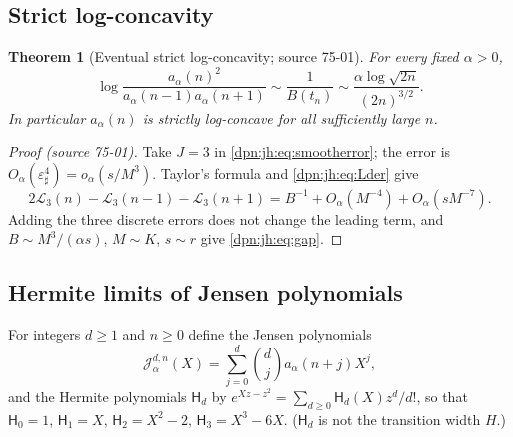 \documentclass[11pt]{article}
\numberwithin{equation}{section}
\newtheorem{theorem}{Theorem}[section]
\theoremstyle{definition}\newtheorem{definition}[theorem]{Definition}
\theoremstyle{remark}\newtheorem{remark}[theorem]{Remark}
\newcommand{\src}[1]{\textup{(source #1)}}
\newcommand{\epsh}{\varepsilon_{\sharp}}
\begin{document}
\subsection{Strict log-concavity}
\begin{theorem}[Eventual strict log-concavity; source 75-01]\label{dpn:jh:thm:concavity}
For every fixed $\alpha>0$,
\begin{equation}\label{dpn:jh:eq:gap}
 \log\frac{a_\alpha(n)^2}{a_\alpha(n-1)a_\alpha(n+1)}
 \sim\frac1{B(t_n)}\sim\frac{\alpha\log\sqrt{2n}}{(2n)^{3/2}}.
\end{equation}
In particular $a_\alpha(n)$ is strictly log-concave for all sufficiently large
$n$.
\end{theorem}
\begin{proof}[Proof \src{75-01}]
Take $J=3$ in \eqref{dpn:jh:eq:smootherror}; the error is
$O_\alpha(\epsh^4)=o_\alpha(s/M^3)$.  Taylor's formula and
\eqref{dpn:jh:eq:Lder} give
\[
 2\mathcal L_3(n)-\mathcal L_3(n-1)-\mathcal L_3(n+1)
 =B^{-1}+O_\alpha(M^{-4})+O_\alpha(sM^{-7}).
\]
Adding the three discrete errors does not change the leading term, and
$B\sim M^3/(\alpha s)$, $M\sim K$, $s\sim r$ give \eqref{dpn:jh:eq:gap}.
\end{proof}

\subsection{Hermite limits of Jensen polynomials}
For integers $d\ge1$ and $n\ge0$ define the Jensen polynomials
\begin{equation}\label{dpn:jh:eq:jensen}
 \mathcal J_\alpha^{d,n}(X)=\sum_{j=0}^d\binom dj a_\alpha(n+j)X^j,
\end{equation}
and the Hermite polynomials $\mathsf H_d$ by
$e^{Xz-z^2}=\sum_{d\ge0}\mathsf H_d(X)z^d/d!$, so that $\mathsf H_0=1$,
$\mathsf H_1=X$, $\mathsf H_2=X^2-2$, $\mathsf H_3=X^3-6X$.  ($\mathsf H_d$ is
not the transition width $H$.)
\end{document}
